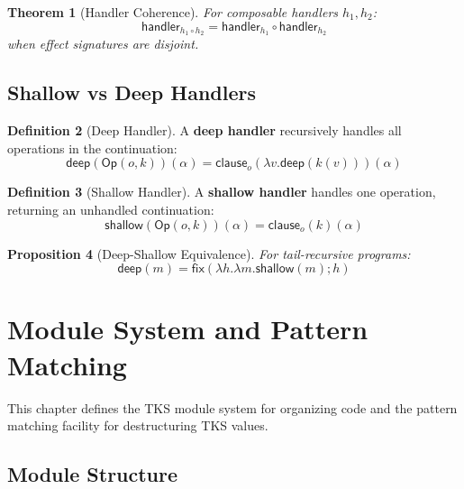 \documentclass[11pt,twoside,openright]{book}
\theoremstyle{definition}
\newtheorem{definition}{Definition}[chapter]
\theoremstyle{plain}
\newtheorem{theorem}[definition]{Theorem}
\newtheorem{proposition}[definition]{Proposition}
\theoremstyle{remark}
\newcommand{\vnewtwo}{\textbf{v7.2 New}}
\begin{document}
\begin{theorem}[Handler Coherence]
\label{thm:handler-coherence}
For composable handlers $h_1, h_2$:
\[
\mathsf{handler}_{h_1 \circ h_2} = \mathsf{handler}_{h_1} \circ \mathsf{handler}_{h_2}
\]
when effect signatures are disjoint.
\end{theorem}

\section{Shallow vs Deep Handlers}

\begin{definition}[Deep Handler]
\label{def:deep-handler}
A \textbf{deep handler} recursively handles all operations in the continuation:
\[
\mathsf{deep}(\mathsf{Op}(o, k))(\alpha) = \mathsf{clause}_o(\lambda v. \mathsf{deep}(k(v)))(\alpha)
\]
\end{definition}

\begin{definition}[Shallow Handler]
\label{def:shallow-handler}
A \textbf{shallow handler} handles one operation, returning an unhandled continuation:
\[
\mathsf{shallow}(\mathsf{Op}(o, k))(\alpha) = \mathsf{clause}_o(k)(\alpha)
\]
\end{definition}

\begin{proposition}[Deep-Shallow Equivalence]
\label{prop:deep-shallow}
For tail-recursive programs:
\[
\mathsf{deep}(m) = \mathsf{fix}(\lambda h. \lambda m. \mathsf{shallow}(m) \mathbin{;} h)
\]
\end{proposition}


\chapter{Module System and Pattern Matching}
\label{ch:modules}

\begin{tcolorbox}[colback=blue!5!white,colframe=blue!75!black,title=\vnewtwo]
This chapter defines the TKS module system for organizing code and the pattern matching facility for destructuring TKS values.
\end{tcolorbox}

\section{Module Structure}
\end{document}
